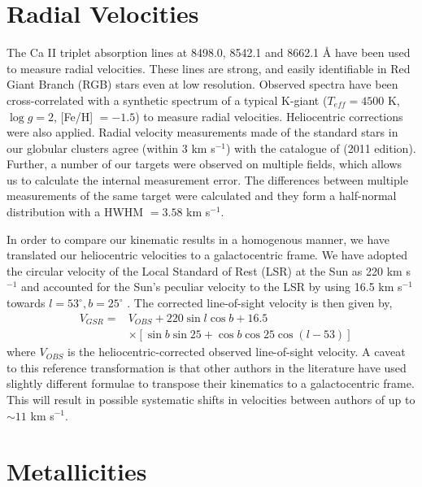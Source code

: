 \documentclass[preprint2]{aastex}
\begin{document}
	
\section{Radial Velocities}
\label{sec:kinematics}

The Ca II triplet absorption lines at 8498.0, 8542.1 and 8662.1 \AA{}  have been used to measure radial velocities. These lines are strong, and easily identifiable in Red Giant Branch (RGB) stars even at low resolution.  Observed spectra have been cross-correlated with a synthetic spectrum of a typical K-giant ($T_{eff} = 4500$ K, $\log{g} = 2$, [Fe/H] $= -1.5$) to measure radial velocities. Heliocentric corrections were also applied. Radial velocity measurements made of the standard stars in our globular clusters agree (within 3 km s$^{-1}$) with the catalogue of \citet{Harris_1996} (2011 edition). Further, a number of our targets were observed on multiple fields, which allows us to calculate the internal measurement error. The differences between multiple measurements of the same target were calculated and they form a half-normal distribution with a HWHM $= 3.58$ km s$^{-1}$. 
	
In order to compare our kinematic results in a homogenous manner, we have translated our heliocentric velocities to a galactocentric frame. We have adopted the circular velocity of the Local Standard of Rest (LSR) at the Sun as 220 km s$^{-1}$ \citep{Kerr;Lynden-Bell_1986} and accounted for the Sun's peculiar velocity to the LSR by using 16.5 km s$^{-1}$ towards $l = 53^\circ, b = 25^\circ$ \citep{Mihalas;Binney_1981}. The corrected line-of-sight velocity is then given by,
\begin{eqnarray}
	&V_{GSR} = & V_{OBS} + 220\sin{l}\cos{b} + 16.5  \\
	& 		 &\times[\sin{b}\sin{25} + \cos{b}\cos{25}\cos{(l - 53)}] \nonumber
\end{eqnarray}
\noindent where $V_{OBS}$ is the heliocentric-corrected observed line-of-sight velocity. A caveat to this reference transformation is that other authors in the literature have used slightly different formulae to transpose their kinematics to a galactocentric frame. This will result in possible systematic shifts in velocities between authors of up to $\sim11$ km s$^{-1}$. 

\section{Metallicities}
\label{sec:metallicities}
\end{document}
